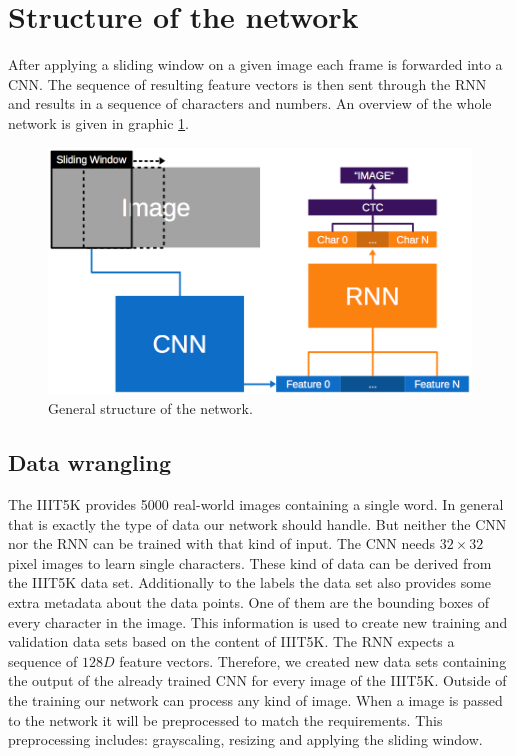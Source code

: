 \documentclass{utue} %
\begin{document}
\section{Structure of the network}

After applying a sliding window on a given image each frame is forwarded into a CNN. The sequence of resulting feature vectors is then sent through the RNN and results in a sequence of characters and numbers. An overview of the whole network is given in graphic \ref{fig:model_general}.
\begin{figure}[h]
	\centering
	\includegraphics[width=.9\columnwidth]{graphics/model_general.png}
	\caption{\label{fig:model_general}General structure of the network.}
\end{figure}


\subsection{Data wrangling}
The IIIT5K provides 5000 real-world images containing a single word. In general that is exactly the type of data our network should handle. But neither the CNN nor the RNN can be trained with that kind of input. The CNN needs $32\times32$ pixel images to learn single characters. These kind of data can be derived from the IIIT5K data set. Additionally to the labels the data set also provides some extra metadata about the data points. One of them are the bounding boxes of every character in the image. This information is used to create  new training and validation data sets based on the content of IIIT5K. The RNN expects a sequence of $128D$ feature vectors. Therefore, we created new data sets containing the output of the already trained CNN for every image of the IIIT5K. 
Outside of the training our network can process any kind of image. When a image is passed to the network it will be preprocessed to match the requirements. This preprocessing includes: grayscaling, resizing and applying the sliding window.
\end{document}
